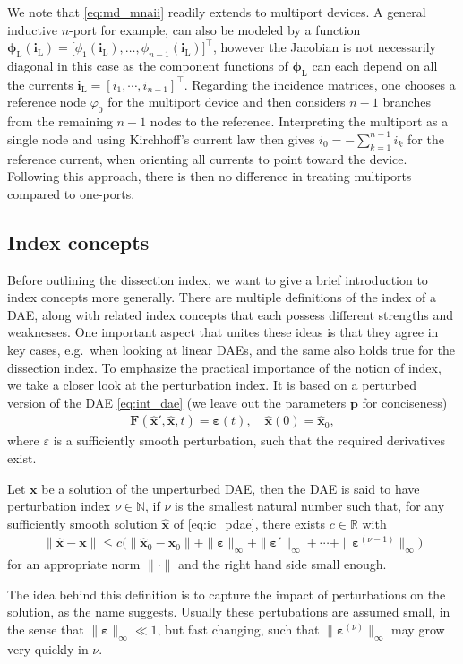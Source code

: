 \documentclass[AMA,STIX1COL]{WileyNJD-v2}
\newcommand{\mb}[1]{\mathbf{#1}}
\newcommand{\mbh}[1]{\hat{\mathbf{#1}}}
\newcommand{\mr}[1]{\mathrm{#1}}
\newcommand{\T}{{\!\top}}
\newcommand{\phiL}{\boldsymbol{\phi}_\mr{L}}
\renewcommand{\i}[1]{\mb{i}_\mr{#1}}
\begin{document}
We note that \eqref{eq:md_mnaii} readily extends to multiport devices\cite{tischendorf1999}. A general inductive $n$-port for example, can also be modeled by a function $\phiL(\i{L}) = \big[ \phi_1(\i{L}), \dotsc, \phi_{n-1}(\i{L}) \big]^\T$, however the Jacobian is not necessarily diagonal in this case as the component functions of $\phiL$ can each depend on all the currents $\i{L} = [i_1, \cdots, i_{n-1}]^\T$. Regarding the incidence matrices, one chooses a reference node $\varphi_0$ for the multiport device and then considers $n-1$ branches from the remaining $n-1$ nodes to the reference. Interpreting the multiport as a single node and using Kirchhoff's current law then gives $i_0 = -\sum_{k=1}^{n-1} i_k$ for the reference current, when orienting all currents to point toward the device. Following this approach, there is then no difference in treating multiports compared to one-ports\cite{tischendorf1999}.

\subsection{Index concepts}
\label{subsec:ic}
Before outlining the dissection index, we want to give a brief introduction to index concepts more generally. There are multiple definitions of the index of a DAE, along with related index concepts that each possess different strengths and weaknesses\cite{mehrmann2015}. One important aspect that unites these ideas is that they agree in key cases, e.g.~when looking at linear DAEs, and the same also holds true for the dissection index. To emphasize the practical importance of the notion of index, we take a closer look at the perturbation index. It is based on a perturbed version of the DAE \eqref{eq:int_dae} (we leave out the parameters $\mb{p}$ for conciseness)
\begin{align}
    \mb{F}(\mbh{x}', \mbh{x}, t) = \boldsymbol{\varepsilon}(t), \quad \mbh{x}(0) = \mbh{x}_0, \label{eq:ic_pdae}
\end{align}
where $\varepsilon$ is a sufficiently smooth perturbation, such that the required derivatives exist.
\begin{definition}
    \label{def:ic_pi}
    Let $\mb{x}$ be a solution of the unperturbed DAE, then the DAE is said to have perturbation index $\nu \in \mathbb{N}$, if $\nu$ is the smallest natural number such that, for any sufficiently smooth solution $\mbh{x}$ of \eqref{eq:ic_pdae}, there exists $c \in \mathbb{R}$ with
    \begin{align*}
        \| \mbh{x} - \mb{x} \| \leq c \big( \| \mbh{x}_0 - \mb{x}_0 \| + \| \boldsymbol{\varepsilon} \|_\infty + \| \boldsymbol{\varepsilon}' \|_\infty + \dotsb + \| \boldsymbol{\varepsilon}^{(\nu - 1)} \|_\infty \big)
    \end{align*}
    for an appropriate norm $\| \cdot \|$ and the right hand side small enough.
\end{definition}
The idea behind this definition is to capture the impact of perturbations on the solution, as the name suggests. Usually these pertubations are assumed small, in the sense that $\| \boldsymbol{\varepsilon} \|_\infty \ll 1$, but fast changing, such that $\| \boldsymbol{\varepsilon}^{(\nu)} \|_\infty$ may grow very quickly in $\nu$.
\end{document}
